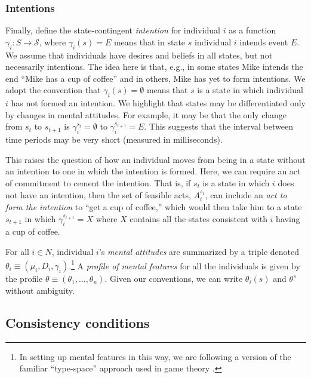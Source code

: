 \documentclass[
11pt,
titlepage,
reqno,
]{article}%
\theoremstyle{definition}
\begin{document}
	\subsubsection{Intentions \label{para: intentions}}
	
	Finally, define the state-contingent \textit{intention} for individual $i$ as a function $\gamma_i:S\rightarrow \mathcal{S}$, where $\gamma_i(s)=E$ means that in state $s$ individual $i$ intends event $E$. 
	We assume that individuals have desires and beliefs in all states, but not necessarily intentions. 
	The idea here is that, e.g., in some states Mike intends the end ``Mike has a cup of coffee'' and in others, Mike has yet to form intentions.
	We adopt the convention that $\gamma_i(s)=\emptyset$ means that $s$ is a state in which individual $i$ has not formed an intention. 
	We highlight that states may be differentiated only by changes in mental attitudes. 
	For example, it may be that the only change from $s_t$ to $s_{t+1}$ is $\gamma_i^{s_t}=\emptyset$ to $\gamma_i^{s_{t+1}}=E$.
	This suggests that the interval between time periods may be very short (measured in milliseconds).
	
	This raises the question of how an individual moves from being in a state without an intention to one in which the intention is formed. 
	Here, we can require an act of commitment to cement the intention. 
	That is, if $s_t$ is a state in which $i$ does not have an intention, then the set of feasible acts, $A^{s_t}_i$, can include an \textit{act to form the intention} to ``get a cup of coffee,'' which would then take him to a state $s_{t+1}$ in which $\gamma_i^{s_{t+1}}=X$ where $X$ contains all the states consistent with $i$ having a cup of coffee.
	
	For all $i\in N$, individual $i$'s \textit{mental attitudes} are summarized by a triple denoted $\theta_i\equiv(\mu_i,D_i,\gamma_i)$.\footnote
	{
		In setting up mental features in this way, we are following a version of the familiar ``type-space'' approach used in game theory \citep[See][]{Harsanyi1967, Mertens1985a}. 
	} 
	A \textit{profile of mental features} for all the individuals is given by the profile $\theta\equiv(\theta_1,\ldots,\theta_n)$. 
	Given our conventions, we can write $\theta_i(s)$ and $\theta^s$ without ambiguity.
	
	
	\subsection{Consistency conditions\label{sec:consistencies}}
	
\end{document}
